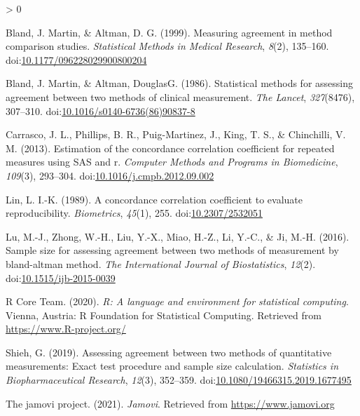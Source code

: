 \documentclass[
]{article}
\newlength{\cslhangindent}
\newenvironment{CSLReferences}[2] %
 {%
  \setlength{\parindent}{0pt}
  \ifodd #1 \everypar{\setlength{\hangindent}{\cslhangindent}}\ignorespaces\fi
  \ifnum #2 > 0
  \setlength{\parskip}{#2\baselineskip}
  \fi
 }%
 {}
\begin{document}
\hypertarget{refs}{}
\begin{CSLReferences}{1}{0}
\leavevmode\hypertarget{ref-bland1999}{}%
Bland, J. Martin, \& Altman, D. G. (1999). Measuring agreement in method
comparison studies. \emph{Statistical Methods in Medical Research},
\emph{8}(2), 135--160.
doi:\href{https://doi.org/10.1177/096228029900800204}{10.1177/096228029900800204}

\leavevmode\hypertarget{ref-bland1986}{}%
Bland, J. Martin, \& Altman, DouglasG. (1986). Statistical methods for
assessing agreement between two methods of clinical measurement.
\emph{The Lancet}, \emph{327}(8476), 307--310.
doi:\href{https://doi.org/10.1016/s0140-6736(86)90837-8}{10.1016/s0140-6736(86)90837-8}

\leavevmode\hypertarget{ref-carrasco2013}{}%
Carrasco, J. L., Phillips, B. R., Puig-Martinez, J., King, T. S., \&
Chinchilli, V. M. (2013). Estimation of the concordance correlation
coefficient for repeated measures using {SAS} and r. \emph{Computer
Methods and Programs in Biomedicine}, \emph{109}(3), 293--304.
doi:\href{https://doi.org/10.1016/j.cmpb.2012.09.002}{10.1016/j.cmpb.2012.09.002}

\leavevmode\hypertarget{ref-lin1989}{}%
Lin, L. I.-K. (1989). A concordance correlation coefficient to evaluate
reproducibility. \emph{Biometrics}, \emph{45}(1), 255.
doi:\href{https://doi.org/10.2307/2532051}{10.2307/2532051}

\leavevmode\hypertarget{ref-lu2016}{}%
Lu, M.-J., Zhong, W.-H., Liu, Y.-X., Miao, H.-Z., Li, Y.-C., \& Ji,
M.-H. (2016). Sample size for assessing agreement between two methods of
measurement by bland-altman method. \emph{The International Journal of
Biostatistics}, \emph{12}(2).
doi:\href{https://doi.org/10.1515/ijb-2015-0039}{10.1515/ijb-2015-0039}

\leavevmode\hypertarget{ref-R-base}{}%
R Core Team. (2020). \emph{R: A language and environment for statistical
computing}. Vienna, Austria: R Foundation for Statistical Computing.
Retrieved from \url{https://www.R-project.org/}

\leavevmode\hypertarget{ref-shieh2019}{}%
Shieh, G. (2019). Assessing agreement between two methods of
quantitative measurements: Exact test procedure and sample size
calculation. \emph{Statistics in Biopharmaceutical Research},
\emph{12}(3), 352--359.
doi:\href{https://doi.org/10.1080/19466315.2019.1677495}{10.1080/19466315.2019.1677495}

\leavevmode\hypertarget{ref-jamovi}{}%
The jamovi project. (2021). \emph{Jamovi}. Retrieved from
\url{https://www.jamovi.org}


\end{CSLReferences}
\end{document}
